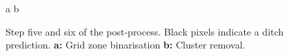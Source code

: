 \documentclass[11pt, review]{elsarticle} %
\begin{document}
\begin{figure} [H]
    \centering
    a{
        }\hspace{5pt}
    b{
        }
    \caption{Step five and six of the post-process. Black pixels indicate a ditch prediction. \textbf{a: }Grid zone binarisation \textbf{b: }Cluster removal.}
    \label{fig:postprocessing3}
\end{figure}
\end{document}
